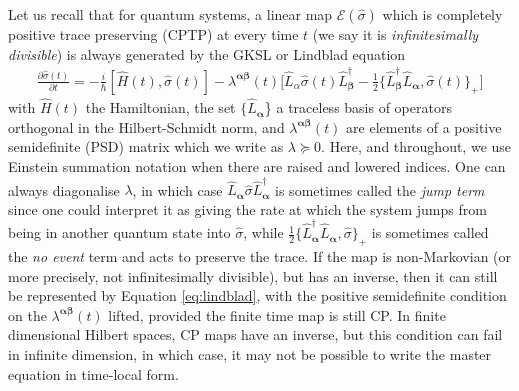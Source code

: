 \documentclass[aps,pra,showpacs,citeautoscript,amsmath,amssymb,floatfix,superscriptaddress,bbm, verbatim,amsfonts,changes,10pt,nofootinbib,longbibliography]{revtex4-1}
\newcommand{\ag}{{\boldsymbol\alpha}}
\newcommand{\bg}{{\boldsymbol\beta}}
\def\L{{\hat{L}}}
\begin{document}
Let us recall that for quantum systems,
a linear map $\mathcal{E}(\hat{\sigma})$  which is completely positive trace preserving (CPTP) at every time $t$ (we say it is {\it infinitesimally divisible}\cite{wolf2008dividing}) is always generated by the GKSL or Lindblad equation\cite{GKS76,Lindblad76}
\begin{align}
\frac{\partial\hat{\sigma}(t)}{\partial t}=-\frac{i}{\hbar}[\hat{H}(t) ,\hat{\sigma}(t)]-\lambda^{\ag\bg}(t)\big[\L_\alpha\hat{\sigma}(t)\L_\bg^\dagger-\frac{1}{2}\{\L_\bg^\dagger\L_\ag,\hat{\sigma}(t)\}_+\big]
\label{eq:lindblad}
\end{align}
with ${ \hat{H}(t)}$ the Hamiltonian, the set $\{\L_\ag$\} a traceless basis of operators orthogonal in the Hilbert-Schmidt norm, and $\lambda^{\ag\bg}(t)$ are elements of a positive semidefinite (PSD) matrix which we write as $\lambda\succeq 0$. Here, and throughout, we use Einstein summation notation when there are raised and lowered indices. One can always diagonalise $\lambda$, in which case $\L_\ag\hat{\sigma}\L_\ag^\dagger$ is sometimes called the {\it jump term} since one could interpret it as giving the rate at which
the system jumps from being in another quantum state into $\hat{\sigma}$, while 
$\frac{1}{2}\{\L_\ag^\dagger\L_\ag,\hat{\sigma}\}_+$ is sometimes called the {\it no event} term and acts to preserve the trace. If the map is non-Markovian (or more precisely, not infinitesimally divisible), but has an inverse, then it can still be represented by Equation \eqref{eq:lindblad}, with the positive semidefinite condition on the $\lambda^{\ag\bg}(t)$ lifted, provided the finite time map is still CP\cite{time-local}. In finite dimensional Hilbert spaces, CP maps have an inverse, but this condition can fail in infinite dimension\cite{buzek1998reconstruction,breuer1999stochastic}, in which case, it may not be possible to write the master equation in time-local form.
\end{document}
